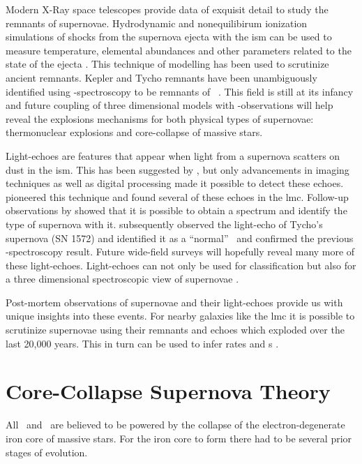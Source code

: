 Modern X-Ray space telescopes provide data of exquisit detail to study the remnants of supernovae. Hydrodynamic and nonequilibirum ionization simulations of shocks from the supernova ejecta with the \gls{ism} can be used to measure temperature, elemental abundances and other parameters related to the state of the ejecta \citep{2003ApJ...593..358B, 2004AstL...30..737S, 2005ApJ...624..198B}. This technique of modelling has been used to scrutinize ancient remnants. Kepler and Tycho remnants have been unambiguously identified using \xray-spectroscopy to be remnants of \sneia\ \citep{2006ApJ...645.1373B, 2007ApJ...668L.135R}. This field is still at its infancy and future coupling of three dimensional models with \xray-observations will help reveal the explosions mechanisms for both physical types of supernovae: thermonuclear explosions and core-collapse of massive stars. 

Light-echoes are features that appear when light from a supernova scatters on dust in the \gls{ism}. This has been suggested by \citet{1940RvMP...12...66Z}, but only advancements in imaging techniques as well as digital processing made it possible to detect these echoes. \cite{2005Natur.438.1132R} pioneered this technique and found several of these echoes in the \gls{lmc}. Follow-up observations by \cite{2008ApJ...680.1137R} showed that it is possible to obtain a spectrum and identify the type of supernova with it. 
\cite{2008Natur.456..617K} subsequently observed the light-echo of Tycho's supernova (SN 1572) and identified it as a ``normal'' \snia\ and confirmed the previous \xray-spectroscopy result. Future wide-field surveys will hopefully reveal many more of these light-echoes. Light-echoes can not only be used for classification but also for a three dimensional spectroscopic view of supernovae \citep[demonstrated on the example of Cassiopeia A remnant][]{2011ApJ...732....3R}.

Post-mortem observations of supernovae and their light-echoes provide us with unique insights into these events. For nearby galaxies like the \gls{lmc} it is possible to scrutinize supernovae using their remnants and echoes which exploded over the last 20,000 years. This in turn can be used to infer rates and \dtd s \citep{2010MNRAS.407.1314M}.
\newpage
\section{Core-Collapse Supernova Theory}

All \snii\ and \snibc\ are believed to be powered by the collapse of the electron-degenerate iron core of massive stars. For the iron core to form there had to be several prior stages of evolution.


